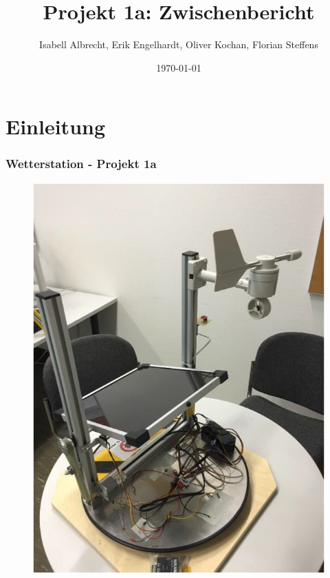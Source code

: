 \documentclass{beamer}
\title[]{Projekt 1a:
  Zwischenbericht} %
\author{Isabell Albrecht, Erik Engelhardt, Oliver Kochan, Florian
  Steffens} %
\institute[HAW] %
{ Hochschule für angewandte Wissenschaften -- Hamburg
  \\ %
  \medskip
}
\date{\today} %
\begin{document}
\begin{frame}
  \titlepage %
\end{frame}

\section{Einleitung}
\begin{frame}
  \frametitle{Wetterstation - Projekt 1a}
  \begin{figure}
    \centering
    \begin{minipage}[t]{0.45\linewidth}
      \centering
      \includegraphics[width=\linewidth]{img/Wetterstation_1.png}
    \end{minipage}%
    \hfill
    \begin{minipage}[t]{0.45\linewidth}
      \centering

\end{minipage}
\end{figure}
\end{frame}
\end{document}

